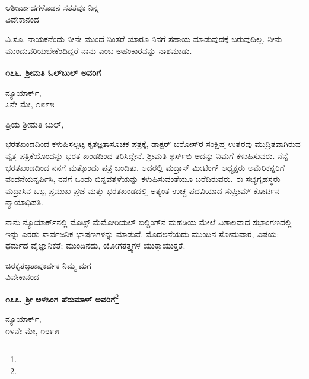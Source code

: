 \begin{flushright}
ಆಶೀರ್ವಾದಗಳೊಡನೆ ಸತತವೂ ನಿನ್ನ\\ವಿವೇಕಾನಂದ
\end{flushright}
\vspace{-0.3cm}

ವಿ.ಸೂ.\enginline{-} ನಾಯಕನೆಂದು ನೀನೇ ಮುಂದೆ ನಿಂತರೆ ಯಾರೂ ನಿನಗೆ ಸಹಾಯ ಮಾಡುವುದಕ್ಕೆ ಬರುವುದಿಲ್ಲ. ನೀನು ಮುಂದುವರಿಯಬೇಕೆಂದಿದ್ದರೆ ನಾನು ಎಂಬ ಅಹಂಕಾರವನ್ನು ನಾಶಮಾಡು.
\vspace{-0.3cm}

\begin{center}
\textbf{೧೭೬. ಶ‍್ರೀಮತಿ ಓಲ್‌ಬುಲ್ ಅವರಿಗೆ}\footnote{}
\end{center}
\vspace{-0.6cm}

\begin{flushright}
ನ್ಯೂಯಾರ್ಕ್,\\೭ನೇ ಮೇ, ೧೮೯೫
\end{flushright}

\vspace{-0.5cm}

\noindent
ಪ್ರಿಯ ಶ‍್ರೀಮತಿ ಬುಲ್,

ಭರತಖಂಡದಿಂದ ಕಳುಹಿಸಲ್ಪಟ್ಟ ಕೃತಜ್ಞತಾಸೂಚಕ ಪತ್ರಕ್ಕೆ, ಡಾಕ್ಟರ್ ಬರೋಸ್‌ರ ಸಂಕ್ಷಿಪ್ತ ಉತ್ತರವು ಮುದ್ರಿತವಾಗಿರುವ ವೃತ್ತ ಪತ್ರಿಕೆಯೊಂದನ್ನು ಭರತ ಖಂಡದಿಂದ ತರಿಸಿದ್ದೇನೆ. ಶ‍್ರೀಮತಿ ಥರ್ಸ್‌ಬಿ ಅದನ್ನು ನಿಮಗೆ ಕಳುಹಿಸುವರು. ನೆನ್ನೆ ಭರತಖಂಡದಿಂದ ನನಗೆ ಮತ್ತೊಂದು ಪತ್ರ ಬಂದಿತು. ಅದರಲ್ಲಿ ಮದ್ರಾಸ್ ಮೀಟಿಂಗ್ ಅಧ್ಯಕ್ಷರು ಅಮೆರಿಕನ್ನರಿಗೆ ವಂದನೆಯನ್ನರ್ಪಿಸಿ, ನನಗೆ ಒಂದು ಬಿನ್ನವತ್ತಳೆಯನ್ನು ಕಳುಹಿಸುವಂತೆಯೂ ಬರೆದಿರುವರು. ಈ ಸಭ್ಯಗೃಹಸ್ಥರು ಮದ್ರಾಸಿನ ಒಬ್ಬ ಪ್ರಮುಖ ಪ್ರಜೆ ಮತ್ತು ಭರತಖಂಡದಲ್ಲಿ ಅತ್ಯಂತ ಉಚ್ಚ ಪದವಿಯಾದ ಸುಪ್ರೀಮ್ ಕೋರ್ಟಿನ ನ್ಯಾಯಾಧಿಪತಿ.

ನಾನು ನ್ಯೂಯಾರ್ಕ್‌ನಲ್ಲಿ ಮೊಟ್ಸ್ ಮೆಮೋರಿಯಲ್ ಬಿಲ್ಡಿಂಗ್‌ನ ಮಹಡಿಯ ಮೇಲೆ ವಿಶಾಲವಾದ ಸಭಾಂಗಣದಲ್ಲಿ ಇನ್ನು ಎರಡು ಸಾರ್ವಜನಿಕ ಭಾಷಣಗಳನ್ನು ಮಾಡುವೆ. ಮೊದಲನೆಯದು ಮುಂದಿನ ಸೋಮವಾರ, ವಿಷಯ: ಧರ್ಮದ ವೈಜ್ಞಾನಿಕತೆ; ಮುಂದಿ\break ನದು, ಯೋಗತತ್ತ್ವಗಳ ಯುಕ್ತಾಯುಕ್ತತೆ.

\vspace{-0.4cm}

{\flushright
ಚಿರಕೃತಜ್ಞತಾಪೂರ್ವಕ ನಿಮ್ಮ ಮಗ\\ವಿವೇಕಾನಂದ\par}

\begin{center}
\textbf{೧೭೭. ಶ‍್ರೀ ಅಳಸಿಂಗ ಪೆರುಮಾಳ್ ಅವರಿಗೆ}\footnote{}
\end{center}

\vspace{-0.5cm}

\begin{flushright}
ನ್ಯೂಯಾರ್ಕ್,\\೧೪ನೇ ಮೇ, ೧೮೯೫
\end{flushright}

